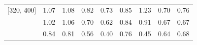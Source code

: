 \begin{table}
\begin{tabular}{lcccccccc}
    [320, 400]             & 1.07                         & 1.08                        & 0.82                     & 0.73                     & 0.85    & 1.23      & 0.70    & 0.76      \\\relax
    [400, 480]             & 1.02                         & 1.06                        & 0.70                     & 0.62                     & 0.84    & 0.91      & 0.67    & 0.67      \\\relax
    [480, inf]             & 0.84                         & 0.81                        & 0.56                     & 0.40                     & 0.76    & 0.45      & 0.64    & 0.68      \\
    \bottomrule
  \end{tabular}\label{tab:norm-factors}
\end{table}

